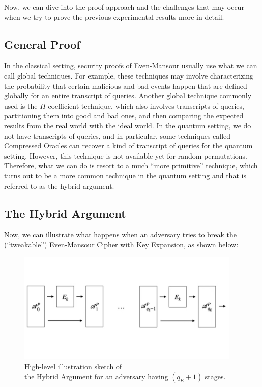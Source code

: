 \documentclass[12pt]{article}
\begin{document}
    Now, we can dive into the proof approach and the challenges that may occur when we try to prove the previous experimental results more in detail.

    
    \subsection{General Proof}
    \label{subsec:general-proof}

    In the classical setting, security proofs of Even-Mansour usually use what we can call global techniques. For example, these techniques may involve characterizing the probability that certain malicious and bad events happen that are defined globally for an entire transcript of queries. Another global technique commonly used is the $H$-coefficient technique, which also involves transcripts of queries, partitioning them into good and bad ones, and then comparing the expected results from the real world with the ideal world. In the quantum setting, we do not have transcripts of queries, and in particular, some techniques called Compressed Oracles can recover a kind of transcript of queries for the quantum setting. However, this technique is not available yet for random permutations. Therefore, what we can do is resort to a much ``more primitive'' technique, which turns out to be a more common technique in the quantum setting and that is referred to as the hybrid argument.

    
    \subsection{The Hybrid Argument}
    \label{subsec:hybrid-argument}

    Now, we can illustrate what happens when an adversary tries to break the (``tweakable'') Even-Mansour Cipher with Key Expansion, as shown below:

    \begin{figure}[ht]
        \captionsetup{justification=centering}
        \centering
        
        \vspace{-2ex}
        \includegraphics[width=0.95\textwidth]{figures/images/img-5.pdf}
        \vspace{-6ex}
        \caption{High-level illustration sketch of\\ the Hybrid Argument for an adversary having $({q}_{E} + 1)$ stages.}
    \end{figure}
    
\end{document}
